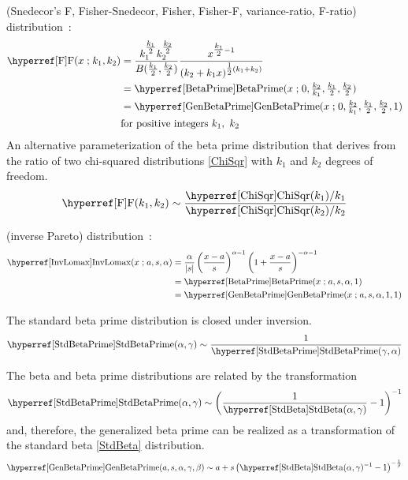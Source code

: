  (Snedecor's F, Fisher-Snedecor, Fisher, Fisher-F, variance-ratio, F-ratio) distribution~\cite{Snedecor1934, Aroian1941, Johnson1995}:
\begin{align}
\label{F}
\opr{F}(x\given k_1,k_2) &= \frac{k_1^{\tfrac{k_1}{2} }   k_2^{\tfrac{k_2}{2}}}{ B(\tfrac{k_1}{2}, \tfrac{k_2}{2})    }
 \frac{x^{\tfrac{k_1}{2} -1}}{(k_2 + k_1 x)^{\tfrac{1}{2}(k_1+k_2)}} \checked
 \\ & =  \opr{BetaPrime}(x\given  0,\tfrac{k_2}{k_1}, \tfrac{k_1}{2},\tfrac{k_2}{2}) \notag \checked
 \\ & =  \opr{GenBetaPrime}(x\given  0,\tfrac{k_2}{k_1}, \tfrac{k_1}{2},\tfrac{k_2}{2},1) \checked
 \notag
\\ & \text{for positive integers } k_1,\ k_2 \notag \checked
\end{align}
An alternative parameterization of the beta prime distribution that derives from the ratio of two chi-squared distributions \eqref{ChiSqr} with $k_1$ and $k_2$ degrees of freedom.
\[
\opr{F}(k_1,k_2) \sim \frac{\opr{ChiSqr}(k_1) / k_1 }{\opr{ChiSqr}(k_2) / k_2} \checked
\notag
\]



 (inverse Pareto) distribution~\cite{Kleiber2003}: 
\begin{align}
\label{InvLomax}
\opr{InvLomax}(x\given a, s,\alpha) &= \frac{\alpha}{|s|} \left(\frac{x-a}{s}\right)^{\alpha -1} \left(1+\frac{x-a}{s}\right)^{-\alpha-1} \checked
\\ \notag &= \opr{BetaPrime}(x\given a, s, \alpha,1) \checked
\\ \notag &= \opr{GenBetaPrime}(x\given a, s, \alpha,1,1) \checked
\end{align}






The standard beta prime distribution is closed under inversion.
\[
\opr{StdBetaPrime}(\alpha,\gamma) \sim \frac{1}{\opr{StdBetaPrime}(\gamma,\alpha)} \checked
\notag
\]


The beta and beta prime distributions are related by the transformation~
\[
\opr{StdBetaPrime}(\alpha,\gamma) \sim \left( \frac{1}{\opr{StdBeta}(\alpha,\gamma)}  -1 \right)^{-1} \checked
\notag
\]
and, therefore, the generalized beta prime can be realized as a transformation of the standard beta \eqref{StdBeta} distribution.
\[
\opr{GenBetaPrime}(a,s,\alpha,\gamma,\beta) \sim a+ s\left( \opr{StdBeta}(\alpha,\gamma)^{-1} -1\right)^{-\sfrac{1}{\beta}}
\checked
\notag
\]


